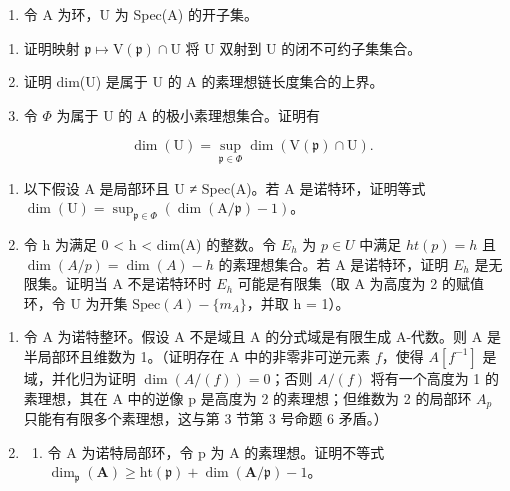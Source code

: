 
\begin{enumerate}
\def\labelenumi{\arabic{enumi})}
\tightlist
\item
  令 A 为环，U 为 Spec(A) 的开子集。
\end{enumerate}

\begin{enumerate}
\def\labelenumi{\alph{enumi})}
\item
  证明映射 \(\mathfrak{p} \mapsto \mathrm{V}(\mathfrak{p}) \cap \mathrm{U}\) 将 U 双射到 U 的闭不可约子集集合。
\item
  证明 dim(U) 是属于 U 的 A 的素理想链长度集合的上界。
\item
  令 \(\Phi\) 为属于 U 的 A 的极小素理想集合。证明有
\end{enumerate}

\[
\dim (\mathrm{U}) = \sup _ {\mathfrak {p} \in \Phi} \dim (\mathrm{V} (\mathfrak {p}) \cap \mathrm{U}).
\]

\begin{enumerate}
\def\labelenumi{\alph{enumi})}
\setcounter{enumi}{3}
\item
  以下假设 A 是局部环且 U ≠ Spec(A)。若 A 是诺特环，证明等式 \(\dim(\mathrm{U}) = \sup_{\mathfrak{p}\in\Phi}(\dim(\mathrm{A}/\mathfrak{p}) - 1)\)。
\item
  令 h 为满足 0 \textless{} h \textless{} dim(A) 的整数。令 \(E_{h}\) 为 \(p \in U\) 中满足 \(ht(p) = h\) 且 \(\dim(A/p) = \dim(A) - h\) 的素理想集合。若 A 是诺特环，证明 \(E_{h}\) 是无限集。证明当 A 不是诺特环时 \(E_{h}\) 可能是有限集（取 A 为高度为 2 的赋值环，令 U 为开集 \(\text{Spec}(A) - \{m_{A}\}\)，并取 h = 1）。
\end{enumerate}

\begin{enumerate}
\def\labelenumi{\arabic{enumi})}
\setcounter{enumi}{1}
\item
  令 A 为诺特整环。假设 A 不是域且 A 的分式域是有限生成 A-代数。则 A 是半局部环且维数为 1。（证明存在 A 中的非零非可逆元素 \(f\)，使得 \(A[f^{-1}]\) 是域，并化归为证明 \(\dim(A/(f)) = 0\)；否则 \(A/(f)\) 将有一个高度为 1 的素理想，其在 A 中的逆像 p 是高度为 2 的素理想；但维数为 2 的局部环 \(A_p\) 只能有有限多个素理想，这与第 3 节第 3 号命题 6 矛盾。）
\item
  \begin{enumerate}
  \def\labelenumii{\alph{enumii})}
  \tightlist
  \item
    令 A 为诺特局部环，令 p 为 A 的素理想。证明不等式 \(\dim_{\mathfrak{p}}(\mathbf{A}) \geqslant \mathrm{ht}(\mathfrak{p}) + \dim(\mathbf{A}/\mathfrak{p}) - 1\)。
  \end{enumerate}
\end{enumerate}

